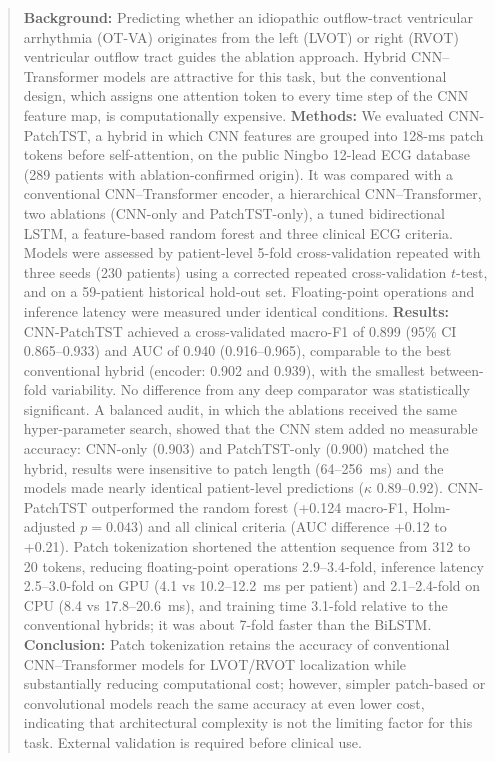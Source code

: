\documentclass[preprint,12pt]{elsarticle}
\begin{document}
\begin{frontmatter}
\begin{abstract}
\textbf{Background:} Predicting whether an idiopathic outflow-tract ventricular arrhythmia (OT-VA) originates from the left (LVOT) or right (RVOT) ventricular outflow tract guides the ablation approach. Hybrid CNN--Transformer models are attractive for this task, but the conventional design, which assigns one attention token to every time step of the CNN feature map, is computationally expensive.
\textbf{Methods:} We evaluated CNN-PatchTST, a hybrid in which CNN features are grouped into 128-ms patch tokens before self-attention, on the public Ningbo 12-lead ECG database (289 patients with ablation-confirmed origin). It was compared with a conventional CNN--Transformer encoder, a hierarchical CNN--Transformer, two ablations (CNN-only and PatchTST-only), a tuned bidirectional LSTM, a feature-based random forest and three clinical ECG criteria. Models were assessed by patient-level 5-fold cross-validation repeated with three seeds (230 patients) using a corrected repeated cross-validation $t$-test, and on a 59-patient historical hold-out set. Floating-point operations and inference latency were measured under identical conditions.
\textbf{Results:} CNN-PatchTST achieved a cross-validated macro-F1 of 0.899 (95\% CI 0.865--0.933) and AUC of 0.940 (0.916--0.965), comparable to the best conventional hybrid (encoder: 0.902 and 0.939), with the smallest between-fold variability. No difference from any deep comparator was statistically significant. A balanced audit, in which the ablations received the same hyper-parameter search, showed that the CNN stem added no measurable accuracy: CNN-only (0.903) and PatchTST-only (0.900) matched the hybrid, results were insensitive to patch length (64--256~ms) and the models made nearly identical patient-level predictions ($\kappa$ 0.89--0.92). CNN-PatchTST outperformed the random forest (+0.124 macro-F1, Holm-adjusted $p=0.043$) and all clinical criteria (AUC difference +0.12 to +0.21). Patch tokenization shortened the attention sequence from 312 to 20 tokens, reducing floating-point operations 2.9--3.4-fold, inference latency 2.5--3.0-fold on GPU (4.1 vs 10.2--12.2~ms per patient) and 2.1--2.4-fold on CPU (8.4 vs 17.8--20.6~ms), and training time 3.1-fold relative to the conventional hybrids; it was about 7-fold faster than the BiLSTM.
\textbf{Conclusion:} Patch tokenization retains the accuracy of conventional CNN--Transformer models for LVOT/RVOT localization while substantially reducing computational cost; however, simpler patch-based or convolutional models reach the same accuracy at even lower cost, indicating that architectural complexity is not the limiting factor for this task. External validation is required before clinical use.
\end{abstract}


\end{frontmatter}
\end{document}
